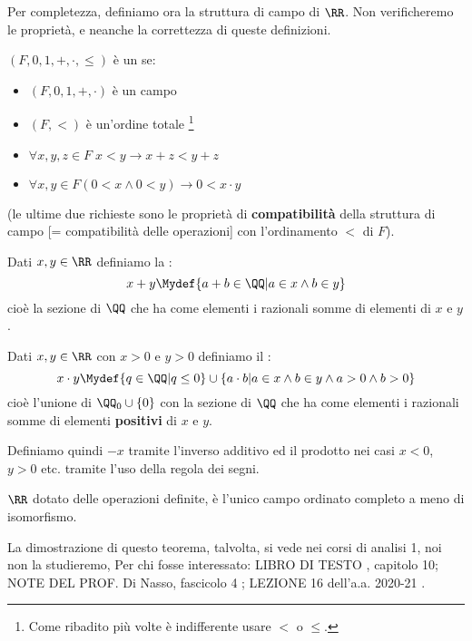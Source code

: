 \documentclass[11pt]{scrartcl}
\begin{document}
Per completezza, definiamo ora la struttura di campo di $\RR$. Non verificheremo le proprietà, e neanche la correttezza di queste definizioni.

\begin{definition}
	$(F,0,1,+,\cdot,\leq)$ è un  se:
	\begin{itemize}
		\item $(F,0,1,+,\cdot)$ è un campo
		\item $(F,<)$ è un'ordine totale \footnote{Come ribadito più volte è indifferente usare $<$ o $\leq$.}
		\item $\forall x,y,z \in F \; x < y \rightarrow x + z < y + z$
		\item $\forall x,y \in F (0 < x \land 0 < y) \rightarrow 0 < x \cdot y$
	\end{itemize}
	(le ultime due richieste sono le proprietà di \textbf{compatibilità} della struttura di campo [= compatibilità delle operazioni] con l'ordinamento $<$ di $F$).
\end{definition}

\begin{definition}[Somma su $\RR$]
	Dati $x,y \in \RR$ definiamo la :
	\[ x + y \Mydef \{a + b \in \QQ | a \in x \land b \in y\}
		\]
	cioè la sezione di $\QQ$ che ha come elementi i razionali somme di elementi di $x$ e $y$.
\end{definition}

\begin{definition}[Prodotto su $\RR$]
	Dati $x,y \in \RR$ con $x > 0$ e $y > 0$ definiamo il :
	\[ x \cdot y \Mydef \{q \in \QQ | q \leq 0\} \cup \{a\cdot b | a \in x  \land b \in y \land a > 0 \land b > 0\}
		\]
	cioè l'unione di $\QQ_0 \cup \{0\}$ con la sezione di $\QQ$ che ha come elementi i razionali somme di elementi \textbf{positivi} di $x$ e $y$.
\end{definition}

Definiamo quindi $-x$ tramite l'inverso additivo ed il prodotto nei casi $x < 0$, $y>0$ etc. tramite l'uso della regola dei segni.

\begin{theorem}
	$\RR$ dotato delle operazioni definite, è l'unico campo ordinato completo a meno di isomorfismo.
\end{theorem}

La dimostrazione di questo teorema, talvolta, si vede nei corsi di analisi 1, noi non la studieremo, Per chi fosse interessato: LIBRO DI TESTO \cite{jech}, capitolo 10; NOTE DEL PROF. Di Nasso, 
fascicolo 4 \cite{diNasso_eti_2019_20}; LEZIONE 16 dell'a.a. 2020-21 \cite{mamino_eti_20_21}.
\end{document}
